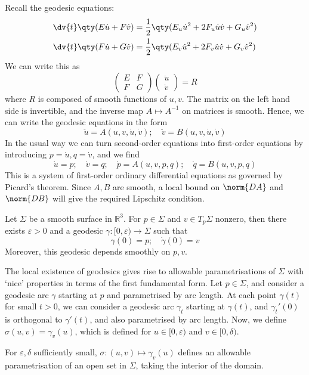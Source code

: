 Recall the geodesic equations:
\begin{align*}
	\dv{t} \qty(E \dot u + F \dot v) & = \frac{1}{2} \qty( E_u \dot u^2 + 2F_u \dot u \dot v + G_u \dot v^2 ) \\
	\dv{t} \qty(F \dot u + G \dot v) & = \frac{1}{2} \qty( E_v \dot u^2 + 2F_v \dot u \dot v + G_v \dot v^2 )
\end{align*}
We can write this as
\[
	\begin{pmatrix}
		E & F \\
		F & G
	\end{pmatrix} \begin{pmatrix}
		\ddot u \\
		\ddot v
	\end{pmatrix}= R
\]
where \( R \) is composed of smooth functions of \( u,v \).
The matrix on the left hand side is invertible, and the inverse map \( A \mapsto A^{-1} \) on matrices is smooth.
Hence, we can write the geodesic equations in the form
\[
	\ddot u = A(u, v, \dot u, \dot v);\quad \ddot v = B(u, v, \dot u, \dot v)
\]
In the usual way we can turn second-order equations into first-order equations by introducing \( p = \dot u, q = \dot v \), and we find
\[
	\dot u = p;\quad \dot v = q;\quad \dot p = A(u,v,p,q);\quad \dot q = B(u,v,p,q)
\]
This is a system of first-order ordinary differential equations as governed by Picard's theorem.
Since \( A, B \) are smooth, a local bound on \( \norm{DA} \) and \( \norm{DB} \) will give the required Lipschitz condition.
\begin{corollary}
	Let \( \Sigma \) be a smooth surface in \( \mathbb R^3 \).
	For \( p \in \Sigma \) and \( v \in T_p \Sigma \) nonzero, then there exists \( \varepsilon > 0 \) and a geodesic \( \gamma \colon [0,\varepsilon) \to \Sigma \) such that
	\[
		\gamma(0) = p;\quad \dot \gamma(0) = v
	\]
	Moreover, this geodesic depends smoothly on \( p,v \).
\end{corollary}
The local existence of geodesics gives rise to allowable parametrisations of \( \Sigma \) with `nice' properties in terms of the first fundamental form.
Let \( p \in \Sigma \), and consider a geodesic arc \( \gamma \) starting at \( p \) and parametrised by arc length.
At each point \( \gamma(t) \) for small \( t > 0 \), we can consider a geodesic arc \( \gamma_t \) starting at \( \gamma(t) \), and \( \gamma_t'(0) \) is orthogonal to \( \gamma'(t) \), and also parametrised by arc length.
Now, we define \( \sigma(u,v) = \gamma_v(u) \), which is defined for \( u \in [0,\varepsilon) \) and \( v \in [0,\delta) \).
\begin{lemma}
	For \( \varepsilon, \delta \) sufficiently small, \( \sigma \colon (u,v) \mapsto \gamma_v(u) \) defines an allowable parametrisation of an open set in \( \Sigma \), taking the interior of the domain.
\end{lemma}
